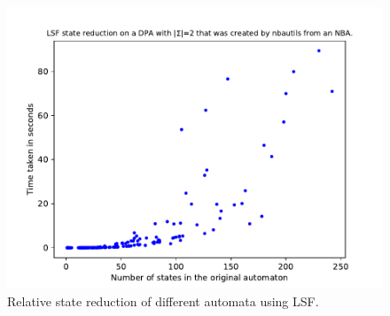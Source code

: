 \begin{figure}
\begin{minipage}{0.49\textwidth}
		\includegraphics[page=2,height=.3\textheight]{../data/analysis/lsf/detnbaut_ap1.pdf} 
		\caption{Relative state reduction of different automata using LSF.}
		\label{exp:fig:lsf_reduct_abs}
	\end{minipage}
\end{figure}


